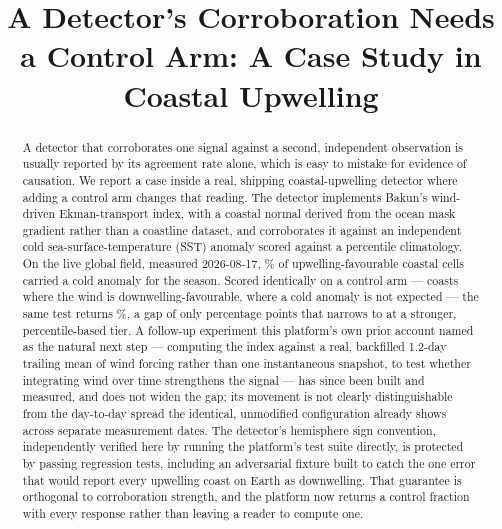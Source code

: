 \documentclass[conference]{IEEEtran}
\begin{document}
\title{A Detector's Corroboration Needs a Control Arm: A Case Study in
Coastal Upwelling}

\author{
}

\maketitle

\begin{abstract}
A detector that corroborates one signal against a second, independent
observation is usually reported by its agreement rate alone, which is easy
to mistake for evidence of causation. We report a case inside a real,
shipping coastal-upwelling detector where adding a control arm changes that
reading. The detector implements Bakun's wind-driven Ekman-transport index,
with a coastal normal derived from the ocean mask gradient rather than a
coastline dataset, and corroborates it against an independent cold
sea-surface-temperature (SST) anomaly scored against a percentile
climatology. On the live global field, measured 2026-08-17,
\UpwellFavourWeak{}\% of upwelling-favourable coastal cells carried a cold
anomaly for the season. Scored identically on a control arm --- coasts where
the wind is downwelling-favourable, where a cold anomaly is not expected ---
the same test returns \UpwellControlWeak{}\%, a gap of only
\UpwellGapWeak{} percentage points that narrows to \UpwellGapStrong{} at a
stronger, percentile-based tier. A follow-up experiment this platform's own
prior account named as the natural next step --- computing the index against
a real, backfilled 1.2-day trailing mean of wind forcing rather than one
instantaneous snapshot, to test whether integrating wind over time
strengthens the signal --- has since been built and measured, and does not
widen the gap; its movement is not clearly distinguishable from the
day-to-day spread the identical, unmodified configuration already shows
across separate measurement dates. The detector's hemisphere sign
convention, independently verified here by running the platform's test
suite directly, is protected by \NTotalUpwellingTests{} passing regression
tests, including an adversarial fixture built to catch the one error that
would report every upwelling coast on Earth as downwelling. That guarantee
is orthogonal to corroboration strength, and the platform now returns a
control fraction with every response rather than leaving a reader to
compute one.
\end{abstract}
\end{document}
